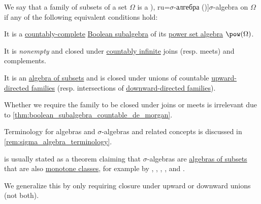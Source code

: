 \begin{definition}\label{def:sigma_algebra}
  We say that a family of subsets of a set \( \Omega \) is a \term[bg=\( \sigma \)-алгебра (\cite[def. 3.3]{Драганов2022ТеорияНаМярката}), ru=\( \sigma \)-алгебра (\cite[def. II.1.4]{Ширяев2007ВероятностьТом1})]{\( \sigma \)-algebra} on \( \Omega \) if any of the following equivalent conditions hold:
  \begin{thmenum}
    \mimprovised It is a \hyperref[def:countably_complete_lattice]{countably-complete} \hyperref[def:boolean_algebra/subobject]{Boolean subalgebra} of its \hyperref[def:power_set_algebra]{power set algebra} \( \pow(\Omega) \).

     It is \emph{nonempty} and closed under \hyperref[def:aleph_zero_related_cardinalities]{countably infinite} joins (resp. meets) and complements.

     It is an \hyperref[def:algebra_of_subsets]{algebra of subsets} and is closed under unions of countable \hyperref[def:directed_set]{upward-directed families} (resp. intersections of \hyperref[def:directed_set]{downward-directed families}).
  \end{thmenum}
\end{definition}
\begin{comments}
  \item Whether we require the family to be closed under joins or meets is irrelevant due to \cref{thm:boolean_subalgebra_countable_de_morgan}.

  \item Terminology for algebras and \( \sigma \)-algebras and related concepts is discussed in \cref{rem:sigma_algebra_terminology}.
  \item {} is usually stated as a theorem claiming that \( \sigma \)-algebras are \hyperref[def:algebra_of_subsets]{algebras of subsets} that are also \hyperref[def:monotone_class]{monotone classes}, for example by
  \textcite[thm. 1.4]{Malliavin1995IntegrationAndProbability},
  \textcite[thm. 1.2.7]{Bobrowski2005FunctionalAnalysis},
  \textcite[lemma 1.7.14]{Tao2011MeasureTheory},
  \textcite[exerc. 1.6(b)]{Cohn2013MeasureTheory},
  \textcite[thm. 2.35]{Folland1999RealAnalysis} and
  \textcite[thm. 1.9.3(i)]{Богачёв2003ОсновыТеорииМерыТом1}.

  We generalize this by only requiring closure under upward or downward unions (not both).
\end{comments}
